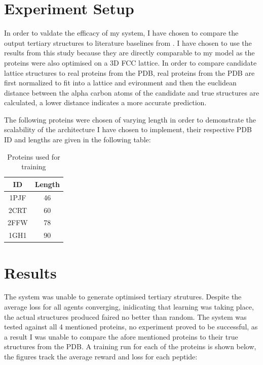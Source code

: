 \section{Experiment Setup}
In order to valdate the efficacy of my system, I have chosen to compare the output
tertiary structures to literature baselines from \cite{Hoque}. I have chosen
to use the results from this study because they are directly comparable
to my model as the proteins were also optimised on a 3D FCC lattice.
In order to compare candidate lattice structures to real proteins
from the PDB, real proteins from the PDB are first normalized to fit
into a lattice and evironment and then the euclidean distance between the alpha carbon atoms
of the candidate and true structures are calculated, a lower distance indicates
a more accurate prediction.

The following proteins were chosen of varying length in order
to demonstrate the scalability of the architecture I have chosen to implement,
their respective PDB ID and lengths are given in the following table:
\begin{table}[!htb]
    \begin{center}
        \caption{Proteins used for training}
\begin{tabular}{||c | c||}
    \hline
    ID & Length\\
    \hline\hline
    1PJF  & 46  \\ 
    \hline
    2CRT & 60  \\
    \hline
    2FFW & 78 \\
    \hline
    1GH1 & 90  \\
    \hline
\end{tabular}
\end{center}
\end{table}
\section{Results}
The system was unable to generate optimised tertiary strutures.
Despite the average loss for all agents converging, inidicating that
learning was taking place, the actual structures produced faired no
better than random. The system was tested against all 4 mentioned proteins,
no experiment proved to be successful, as a result I was unable to compare
the afore mentioned proteins to their true structures from the PDB.
A training run for each of the proteins is shown below,
the figures track the average reward and loss for each peptide:

